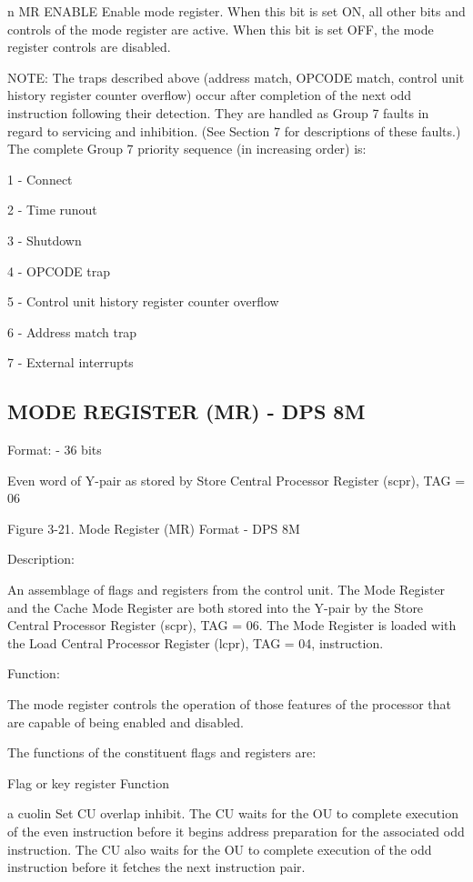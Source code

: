 n MR ENABLE Enable mode register. When this bit is set ON, all other bits and
controls of the mode register are active. When this bit is set OFF, the mode
register controls are disabled.  

NOTE: The traps described above (address match, OPCODE match, control unit
history register counter overflow) occur after completion of the next odd
instruction following their detection. They are handled as Group 7 faults in
regard to servicing and inhibition. (See Section 7 for descriptions of these
faults.) The complete Group 7 priority sequence (in increasing order) is:

1 - Connect

2 - Time runout

3 - Shutdown

4 - OPCODE trap

5 - Control unit history register counter overflow

6 - Address match trap

7 - External interrupts

\subsection{MODE REGISTER (MR) - DPS 8M}

Format: - 36 bits

Even word of Y-pair as stored by Store Central Processor Register (scpr), TAG = 06

Figure 3-21. Mode Register (MR) Format - DPS 8M

Description:

An assemblage of flags and registers from the control unit. The Mode Register
and the Cache Mode Register are both stored into the Y-pair by the Store
Central Processor Register (scpr), TAG = 06. The Mode Register is loaded with
the Load Central Processor Register (lcpr), TAG = 04, instruction.

Function:

The mode register controls the operation of those features of the processor
that are capable of being enabled and disabled.

The functions of the constituent flags and registers are:

Flag or key register Function

a cuolin Set CU overlap inhibit. The CU waits for the OU to complete execution
of the even instruction before it begins address preparation for the associated
odd instruction. The CU also waits for the OU to complete execution of the odd
instruction before it fetches the next instruction pair.

